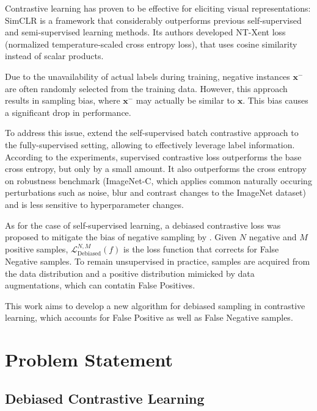 \documentclass{article}
\begin{document}
Contrastive learning has proven to be effective for eliciting visual representations: SimCLR  \citep{Chen2020SimCLR} is a framework that considerably outperforms previous self-supervised and semi-supervised learning methods. Its authors developed NT-Xent loss (normalized temperature-scaled cross entropy loss), that uses cosine similarity instead of scalar products.

Due to the unavailability of actual labels during training, negative instances $\textbf{x}^-$ are often randomly selected from the training data. However, this approach results in sampling bias, where $\textbf{x}^-$ may actually be similar to $\textbf{x}$. This bias causes a significant drop in performance. 

To address this issue, \citep{khosla2021supervised} extend the self-supervised batch contrastive approach to the fully-supervised setting, allowing to effectively leverage label information. According to the experiments, supervised contrastive loss outperforms the base cross entropy, but only by a small amount. It also outperforms the cross entropy on robustness benchmark (ImageNet-C, which applies common naturally occuring perturbations such as noise, blur and contrast changes to the ImageNet dataset) and is less sensitive to hyperparameter changes.

As for the case of self-supervised learning, a debiased contrastive loss was proposed to mitigate the bias of negative sampling by \citep{chuang2021debiased}. Given $N$ negative and $M$ positive samples, $\mathcal{L}^{N, M}_{\text{Debiased}} (f)$ is the loss function that corrects for False Negative samples. To remain unsupervised in practice, samples are acquired from the data distribution and a positive distribution mimicked by data augmentations, which can contatin False Positives.

This work aims to develop a new algorithm for debiased sampling in contrastive learning, which accounts for False Positive as well as False Negative samples. 



\section{Problem Statement}
\label{sec:headings}

\subsection{Debiased Contrastive Learning}
\end{document}
